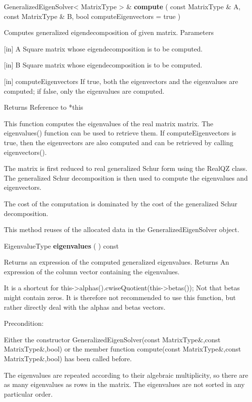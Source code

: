 \vspace{0.3cm}
GeneralizedEigenSolver< MatrixType > \& \textbf{compute}  ( const MatrixType \&  A,  const MatrixType \&  B,  bool  computeEigenvectors = true )   

Computes generalized eigendecomposition of given matrix. 
Parameters

[in] A Square matrix whose eigendecomposition is to be computed.  

[in] B Square matrix whose eigendecomposition is to be computed.  

[in] computeEigenvectors If true, both the eigenvectors and the eigenvalues are computed; if false, only the eigenvalues are computed.  

Returns Reference to *this 

This function computes the eigenvalues of the real matrix matrix. The eigenvalues() function can be used to retrieve them. If computeEigenvectors is true, then the eigenvectors are also computed and can be retrieved by calling eigenvectors().

The matrix is first reduced to real generalized Schur form using the RealQZ class. The generalized Schur decomposition is then used to compute the eigenvalues and eigenvectors.

The cost of the computation is dominated by the cost of the generalized Schur decomposition.

This method reuses of the allocated data in the GeneralizedEigenSolver object. 



\vspace{0.3cm}
EigenvalueType \textbf{eigenvalues}  ( )  const 

Returns an expression of the computed generalized eigenvalues. 
Returns An expression of the column vector containing the eigenvalues.

It is a shortcut for
this->alphas().cwiseQuotient(this->betas()); Not that betas might contain zeros. It is therefore not recommended to use this function, but rather directly deal with the alphas and betas vectors.

Precondition:

Either the constructor GeneralizedEigenSolver(const MatrixType\&,const MatrixType\&,bool) or the member function compute(const MatrixType\&,const MatrixType\&,bool) has been called before.

The eigenvalues are repeated according to their algebraic multiplicity, so there are as many eigenvalues as rows in the matrix. The eigenvalues are not sorted in any particular order.



